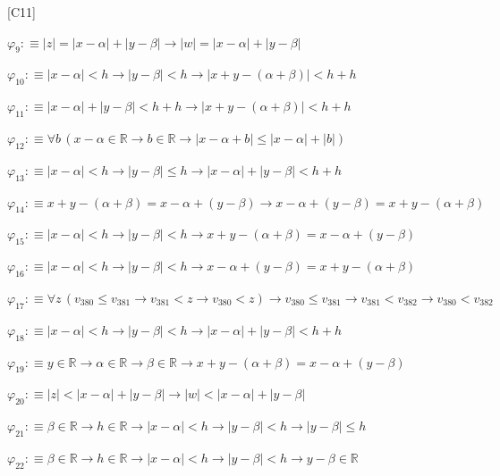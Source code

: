 \begin{fullproof}{[C11]}
\begin{abbrevlist}
\item $\varphi_{9} :\equiv \lvert z \rvert = \lvert x - \alpha \rvert + \lvert y - \beta \rvert \to \lvert w \rvert = \lvert x - \alpha \rvert + \lvert y - \beta \rvert$
\item $\varphi_{10} :\equiv \lvert x - \alpha \rvert < h \to \lvert y - \beta \rvert < h \to \lvert x + y - (\alpha + \beta) \rvert < h + h$
\item $\varphi_{11} :\equiv \lvert x - \alpha \rvert + \lvert y - \beta \rvert < h + h \to \lvert x + y - (\alpha + \beta) \rvert < h + h$
\item $\varphi_{12} :\equiv \forall b\,(x - \alpha \in \mathbb{R} \to b \in \mathbb{R} \to \lvert x - \alpha + b \rvert \leq \lvert x - \alpha \rvert + \lvert b \rvert)$
\item $\varphi_{13} :\equiv \lvert x - \alpha \rvert < h \to \lvert y - \beta \rvert \leq h \to \lvert x - \alpha \rvert + \lvert y - \beta \rvert < h + h$
\item $\varphi_{14} :\equiv x + y - (\alpha + \beta) = x - \alpha + (y - \beta) \to x - \alpha + (y - \beta) = x + y - (\alpha + \beta)$
\item $\varphi_{15} :\equiv \lvert x - \alpha \rvert < h \to \lvert y - \beta \rvert < h \to x + y - (\alpha + \beta) = x - \alpha + (y - \beta)$
\item $\varphi_{16} :\equiv \lvert x - \alpha \rvert < h \to \lvert y - \beta \rvert < h \to x - \alpha + (y - \beta) = x + y - (\alpha + \beta)$
\item $\varphi_{17} :\equiv \forall z\,(v_{380} \leq v_{381} \to v_{381} < z \to v_{380} < z) \to v_{380} \leq v_{381} \to v_{381} < v_{382} \to v_{380} < v_{382}$
\item $\varphi_{18} :\equiv \lvert x - \alpha \rvert < h \to \lvert y - \beta \rvert < h \to \lvert x - \alpha \rvert + \lvert y - \beta \rvert < h + h$
\item $\varphi_{19} :\equiv y \in \mathbb{R} \to \alpha \in \mathbb{R} \to \beta \in \mathbb{R} \to x + y - (\alpha + \beta) = x - \alpha + (y - \beta)$
\item $\varphi_{20} :\equiv \lvert z \rvert < \lvert x - \alpha \rvert + \lvert y - \beta \rvert \to \lvert w \rvert < \lvert x - \alpha \rvert + \lvert y - \beta \rvert$
\item $\varphi_{21} :\equiv \beta \in \mathbb{R} \to h \in \mathbb{R} \to \lvert x - \alpha \rvert < h \to \lvert y - \beta \rvert < h \to \lvert y - \beta \rvert \leq h$
\item $\varphi_{22} :\equiv \beta \in \mathbb{R} \to h \in \mathbb{R} \to \lvert x - \alpha \rvert < h \to \lvert y - \beta \rvert < h \to y - \beta \in \mathbb{R}$

\end{abbrevlist}
\end{fullproof}
